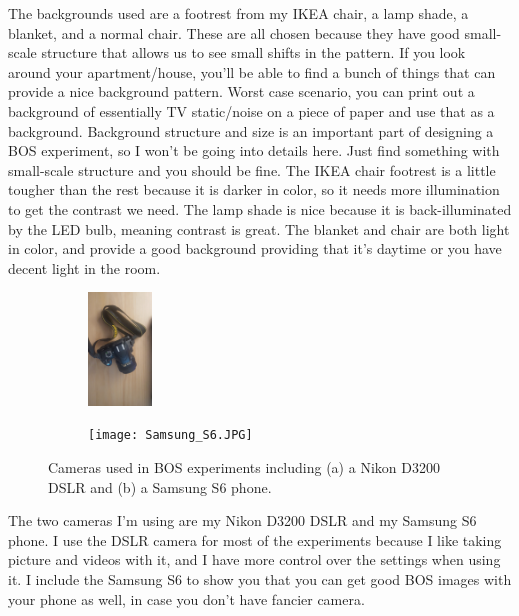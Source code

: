 \documentclass[letterpaper,12pt]{article}
\begin{document}
The backgrounds used are a footrest from my IKEA chair, a lamp shade, a blanket, and a normal chair.  These are all chosen because they have good small-scale structure that allows us to see small shifts in the pattern.  If you look around your apartment/house, you'll be able to find a bunch of things that can provide a nice background pattern.  Worst case scenario, you can print out a background of essentially TV static/noise on a piece of paper and use that as a background.  Background structure and size is an important part of designing a BOS experiment, so I won't be going into details here.  Just find something with small-scale structure and you should be fine.  The IKEA chair footrest is a little tougher than the rest because it is darker in color, so it needs more illumination to get the contrast we need.  The lamp shade is nice because it is back-illuminated by the LED bulb, meaning contrast is great.  The blanket and chair are both light in color, and provide a good background providing that it's daytime or you have decent light in the room.

\begin{figure}[h]
    \centering
    \begin{subfigure}[b]{0.35\textwidth}
    	\centering
        \includegraphics[height=3cm]{DSLR.JPG}
        \caption{}
        \label{fig:DSLR}
    \end{subfigure}
    \begin{subfigure}[b]{0.35\textwidth}
    	\centering
        \texttt{[image: Samsung\_S6.JPG]}
        \caption{}
        \label{fig:Samsung_S6}
    \end{subfigure}

    \caption{Cameras used in BOS experiments including (a) a Nikon D3200 DSLR and (b) a Samsung S6 phone.}
    \label{fig:Cameras}
\end{figure}

The two cameras I'm using are my Nikon D3200 DSLR and my Samsung S6 phone.  I use the DSLR camera for most of the experiments because I like taking picture and videos with it, and I have more control over the settings when using it.  I include the Samsung S6 to show you that you can get good BOS images with your phone as well, in case you don't have fancier camera.
\end{document}
